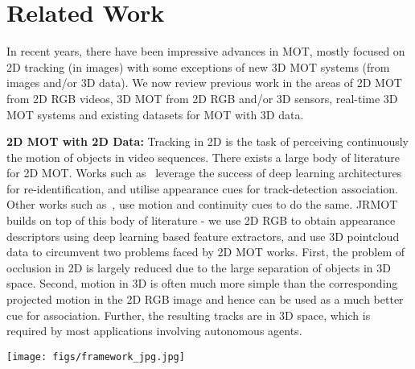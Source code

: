\documentclass[letterpaper, 10 pt, conference]{ieeeconf}
\newcommand{\methodname}{{JRMOT}\xspace}
\begin{document}
%
 \section{Related Work} 
\label{s:RW}

In recent years, there have been impressive advances in MOT, mostly focused on 2D tracking (in images) with some exceptions of new 3D MOT systems (from images and/or 3D data).
We now review previous work in the areas of 2D MOT from 2D RGB videos, 3D MOT from 2D RGB and/or 3D sensors, real-time 3D MOT systems and existing datasets for MOT with 3D data.




\textbf{2D MOT with 2D Data:}
Tracking in 2D is the task of perceiving continuously the motion of objects in video sequences. 
There exists a large body of literature for 2D MOT. Works such as~\cite{bergmann2019tracking, feng2019multi, sun2019deep, yoon2019online} leverage the success of deep learning architectures for re-identification, and utilise appearance cues for track-detection association. Other works such as~\cite{wang2019exploit,rezatofighiiccv2015}, use motion and continuity cues to do the same. 
\methodname builds on top of this body of literature - we use 2D RGB to obtain appearance descriptors using deep learning based feature extractors, and use 3D pointcloud data to circumvent two problems faced by 2D MOT works. First, the problem of occlusion in 2D is largely reduced due to the large separation of objects in 3D space. Second, motion in 3D is often much more simple than the corresponding projected motion in the 2D RGB image and hence can be used as a much better cue for association. Further, the resulting tracks are in 3D space, which is required by most applications involving autonomous agents.



\begin{figure*}[th!]
    \centering
    \texttt{[image: figs/framework\_jpg.jpg]}
    \caption{\methodname: Our proposed 3D MOT system is composed of a Detection block, that includes the 2D detector (Sec~\ref{ss:2Ddetection}), 2D appearance model (Sec~\ref{ss:appmod}), 3D detection and feature extractor (Sec~\ref{ss:3Ddetections}), and a Tracking block containing data association (Sec ~\ref{ss:ff} and Sec~\ref{ss:da}) and filtering (Sec~\ref{ss:filtering}) and track management (Sec~\ref{ss:track_manage}) components; $\mathcal{T}, \mathcal{D}, \mathcal{F}$ refer to tracks, detections, features respectively with the superscript indicating the space; The system integrates information from 2D RGB images and 3D pointclouds into a single 3D multi-object recursive estimation tracker with real-time performance}
    \label{fig:framework}
\end{figure*}
\end{document}
